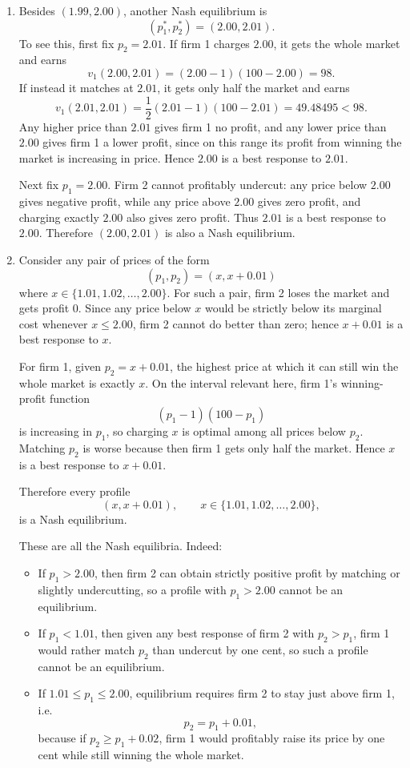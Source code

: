 \documentclass[12pt,a4paper]{article}
\begin{document}
\begin{enumerate}[label=(\alph*)]
  \item Besides $(1.99,2.00)$, another Nash equilibrium is
  \[
      (p_1^*,p_2^*)=(2.00,2.01).
  \]
  To see this, first fix $p_2=2.01$. If firm 1 charges $2.00$, it gets the whole market and earns
  \[
      v_1(2.00,2.01)=(2.00-1)(100-2.00)=98.
  \]
  If instead it matches at $2.01$, it gets only half the market and earns
  \[
      v_1(2.01,2.01)=\frac12(2.01-1)(100-2.01)=49.48495<98.
  \]
  Any higher price than $2.01$ gives firm 1 no profit, and any lower price than $2.00$ gives firm 1 a lower profit, since on this range its profit from winning the market is increasing in price. Hence $2.00$ is a best response to $2.01$.

  Next fix $p_1=2.00$. Firm 2 cannot profitably undercut: any price below $2.00$ gives negative profit, while any price above $2.00$ gives zero profit, and charging exactly $2.00$ also gives zero profit. Thus $2.01$ is a best response to $2.00$. Therefore $(2.00,2.01)$ is also a Nash equilibrium.

  \item Consider any pair of prices of the form
  \[
      (p_1,p_2)=(x,x+0.01)
  \]
  where $x\in\{1.01,1.02,\dots,2.00\}$. For such a pair, firm 2 loses the market and gets profit $0$. Since any price below $x$ would be strictly below its marginal cost whenever $x\le 2.00$, firm 2 cannot do better than zero; hence $x+0.01$ is a best response to $x$.

  For firm 1, given $p_2=x+0.01$, the highest price at which it can still win the whole market is exactly $x$. On the interval relevant here, firm 1's winning-profit function
  \[
      (p_1-1)(100-p_1)
  \]
  is increasing in $p_1$, so charging $x$ is optimal among all prices below $p_2$. Matching $p_2$ is worse because then firm 1 gets only half the market. Hence $x$ is a best response to $x+0.01$.

  Therefore every profile
  \[
      (x,x+0.01), \qquad x\in\{1.01,1.02,\dots,2.00\},
  \]
  is a Nash equilibrium.

  These are all the Nash equilibria. Indeed:
  \begin{itemize}
      \item If $p_1>2.00$, then firm 2 can obtain strictly positive profit by matching or slightly undercutting, so a profile with $p_1>2.00$ cannot be an equilibrium.
      \item If $p_1<1.01$, then given any best response of firm 2 with $p_2>p_1$, firm 1 would rather match $p_2$ than undercut by one cent, so such a profile cannot be an equilibrium.
      \item If $1.01\le p_1\le 2.00$, equilibrium requires firm 2 to stay just above firm 1, i.e.
      \[
          p_2=p_1+0.01,
      \]
      because if $p_2\ge p_1+0.02$, firm 1 would profitably raise its price by one cent while still winning the whole market.
  \end{itemize}


\end{enumerate}
\end{document}
